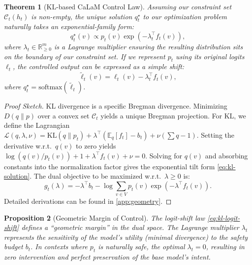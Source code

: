 \documentclass{article}
\theoremstyle{plain}
\newtheorem{theorem}{Theorem}[section]
\newtheorem{proposition}[theorem]{Proposition}
\theoremstyle{definition}
\theoremstyle{remark}
\begin{document}
\begin{theorem}[KL-based CaLaM Control Law]
\label{thm:kl}
Assuming our constraint set $\mathcal{C}_t(h_t)$ is non-empty, the unique solution $q_t^\star$ to our optimization problem naturally takes an exponential-family form:
\begin{equation}
   q_t^\star(v) \propto p_t(v) \exp(-\lambda_t^\top f_t(v)),
   \label{eq:kl-solution}
\end{equation}
where $\lambda_t \in \mathbb{R}^m_{\ge 0}$ is a Lagrange multiplier ensuring the resulting distribution sits on the boundary of our constraint set. If we represent $p_t$ using its original logits $\ell_t$, the controlled output can be expressed as a simple shift:
\begin{equation}
  \tilde{\ell}_t(v) = \ell_t(v) - \lambda_t^\top f_t(v),
  \label{eq:kl-logit-shift}
\end{equation}
where $q_t^\star = \mathrm{softmax}(\tilde{\ell}_t)$.
\end{theorem}

\begin{proof}[Proof Sketch]
KL divergence is a specific Bregman divergence. Minimizing $D(q \| p)$ over a convex set $\mathcal{C}_t$ yields a unique Bregman projection. For KL, we define the Lagrangian $\mathcal{L}(q, \lambda, \nu) = \mathrm{KL}(q \| p_t) + \lambda^\top (\mathbb{E}_q[f_t] - b_t) + \nu(\sum q - 1)$. Setting the derivative w.r.t.\ $q(v)$ to zero yields $\log(q(v)/p_t(v)) + 1 + \lambda^\top f_t(v) + \nu = 0$. Solving for $q(v)$ and absorbing constants into the normalization factor gives the exponential tilt form \eqref{eq:kl-solution}. The dual objective to be maximized w.r.t.\ $\lambda \ge 0$ is:
\begin{equation}
   g_t(\lambda) = -\lambda^\top b_t - \log \sum_{v \in V} p_t(v) \exp(-\lambda^\top f_t(v)).
   \label{eq:dual-kl}
\end{equation}
Detailed derivations can be found in \cref{app:geometry}.
\end{proof}

\begin{proposition}[Geometric Margin of Control]
The logit-shift law \eqref{eq:kl-logit-shift} defines a ``geometric margin'' in the dual space. The Lagrange multiplier $\lambda_t$ represents the sensitivity of the model's utility (minimal divergence) to the safety budget $b_t$. In contexts where $p_t$ is naturally safe, the optimal $\lambda_t = 0$, resulting in zero intervention and perfect preservation of the base model's intent.
\end{proposition}
\end{document}
